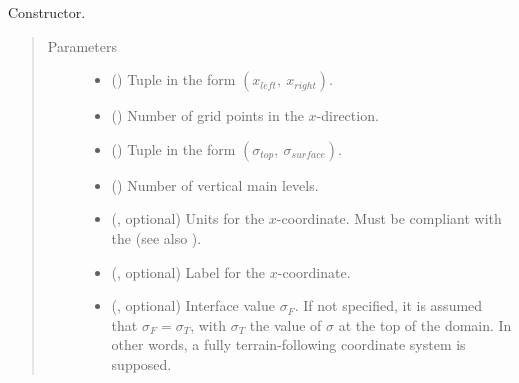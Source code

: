 \documentclass[letterpaper,10pt,english]{sphinxmanual}
\begin{document}
\begin{fulllineitems}
\begin{quote}
\begin{description}
\begin{itemize}
\end{itemize}

\end{description}\end{quote}

\begin{fulllineitems}
\label{\detokenize{api:tasmania.grids.sigma.Sigma2d.__init__}}
Constructor.
\begin{quote}\begin{description}
\item[{Parameters}] \leavevmode\begin{itemize}
\item {} 
 () \textendash{} Tuple in the form \((x_{left}, ~ x_{right})\).

\item {} 
 () \textendash{} Number of grid points in the \(x\)-direction.

\item {} 
 () \textendash{} Tuple in the form \((\sigma_{top}, ~ \sigma_{surface})\).

\item {} 
 () \textendash{} Number of vertical main levels.

\item {} 
 (, optional) \textendash{} 
Units for the \(x\)-coordinate. Must be compliant with the 
(see also {\hyperref[\detokenize{api:tasmania.grids.axis.Axis.__init__}]{}}).


\item {} 
 (, optional) \textendash{} Label for the \(x\)-coordinate.

\item {} 
 (, optional) \textendash{} Interface value \(\sigma_F\). If not specified, it is assumed that \(\sigma_F = \sigma_T\),
with \(\sigma_T\) the value of \(\sigma\) at the top of the domain. In other words, a fully
terrain-following coordinate system is supposed.


\end{itemize}
\end{description}
\end{quote}
\end{fulllineitems}
\end{fulllineitems}
\end{document}
